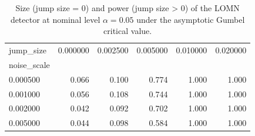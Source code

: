 \begin{table}
\caption{Size (jump size = 0) and power (jump size > 0) of the LOMN detector at nominal level $\alpha = 0.05$ under the asymptotic Gumbel critical value.}
\label{tab:size_power_raw_gumbel}
\begin{tabular}{lrrrrr}
\toprule
jump_size & 0.000000 & 0.002500 & 0.005000 & 0.010000 & 0.020000 \\
noise_scale &  &  &  &  &  \\
\midrule
0.000500 & 0.066 & 0.100 & 0.774 & 1.000 & 1.000 \\
0.001000 & 0.056 & 0.108 & 0.744 & 1.000 & 1.000 \\
0.002000 & 0.042 & 0.092 & 0.702 & 1.000 & 1.000 \\
0.005000 & 0.044 & 0.098 & 0.584 & 1.000 & 1.000 \\
\bottomrule
\end{tabular}
\end{table}
